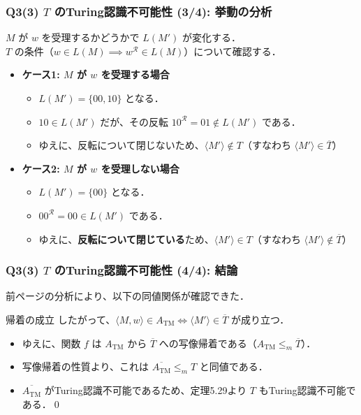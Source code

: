 \begin{frame}[fragile]
\frametitle{Q3(3) $T$ のTuring認識不可能性 (3/4): 挙動の分析}
$M$ が $w$ を受理するかどうかで $L(M')$ が変化する．\\
$T$ の条件（$w \in L(M) \implies w^\mathcal{R} \in L(M)$）について確認する．

\begin{itemize}
  \item \textbf{ケース1: $M$ が $w$ を受理する場合}
  \begin{itemize}
      \item $L(M') = \{00, 10\}$ となる．
      \item $10 \in L(M')$ だが、その反転 $10^\mathcal{R} = 01 \notin L(M')$ である．
      \item ゆえに、\alert{反転について閉じない}ため、$\langle M' \rangle \notin T$（すなわち $\langle M' \rangle \in \overline{T}$）
  \end{itemize}
  \vspace{1em}
  \item \textbf{ケース2: $M$ が $w$ を受理しない場合}
  \begin{itemize}
      \item $L(M') = \{00\}$ となる．
      \item $00^\mathcal{R} = 00 \in L(M')$ である．
      \item ゆえに、\textbf{反転について閉じている}ため、$\langle M' \rangle \in T$（すなわち $\langle M' \rangle \notin \overline{T}$）
  \end{itemize}
\end{itemize}
\end{frame}

\begin{frame}[fragile]
\frametitle{Q3(3) $T$ のTuring認識不可能性 (4/4): 結論}
前ページの分析により、以下の同値関係が確認できた．

\begin{block}{帰着の成立}
  したがって、\alert{$\langle M, w \rangle \in A_{\mathrm{TM}} \iff \langle M' \rangle \in \overline{T}$} が成り立つ．
\end{block}

\vspace{0.5em}
\begin{itemize}
  \item ゆえに、関数 $f$ は $A_{\mathrm{TM}}$ から $\overline{T}$ への写像帰着である（$A_{\mathrm{TM}} \le_m \overline{T}$）．
  \item 写像帰着の性質より、これは \textbf{$\overline{A_{\mathrm{TM}}} \le_m T$} と同値である．
  \item $\overline{A_{\mathrm{TM}}}$ がTuring認識不可能であるため、\alert{定理5.29より $T$ もTuring認識不可能}である．\qed
\end{itemize}
\end{frame}

